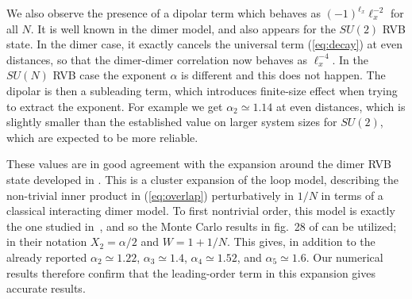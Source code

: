 \documentclass[11pt]{iopart}
\begin{document}
We also observe the presence of a dipolar term which behaves as $(-1)^{\ell_x} \ell_x^{-2}$ for all $N$. It is well known in the dimer model\cite{Alet_dimers2}, and also appears for the $SU(2)$ RVB state\cite{RVB2}. In the dimer case, it exactly cancels the universal term (\ref{eq:decay}) at even distances, so that the dimer-dimer correlation now behaves as\cite{FisherStephenson} $\ell_x^{-4}$. In the $SU(N)$ RVB case the exponent $\alpha$ is different and this does not happen. The dipolar is then a subleading term, which introduces finite-size effect when trying to extract the exponent. For example we get $\alpha_2\simeq 1.14$ at even distances, which is slightly smaller than the established value on larger system sizes\cite{RVB1,RVB2} for $SU(2)$, which are expected to be more reliable. 


These values are in good agreement with the expansion around the dimer RVB state developed in \cite{Damle}. This is a cluster expansion of the loop model, describing the non-trivial inner product in (\ref{eq:overlap}) perturbatively in $1/N$ in terms of a classical interacting dimer model. 
To first nontrivial order, this model is exactly the one studied in \,\cite{Alet_dimers1,Alet_dimers2}, and so the Monte Carlo results in fig.\ 28 of \cite{Alet_dimers2} can be utilized; in their notation $X_2=\alpha/2$ and $W=1+1/N$. This gives, in addition to the already reported $\alpha_2\simeq 1.22$, $\alpha_3 \simeq 1.4$, $\alpha_4 \simeq 1.52$, and $\alpha_5\simeq 1.6$. Our numerical results therefore confirm that the leading-order term in this expansion gives accurate results.
\end{document}
